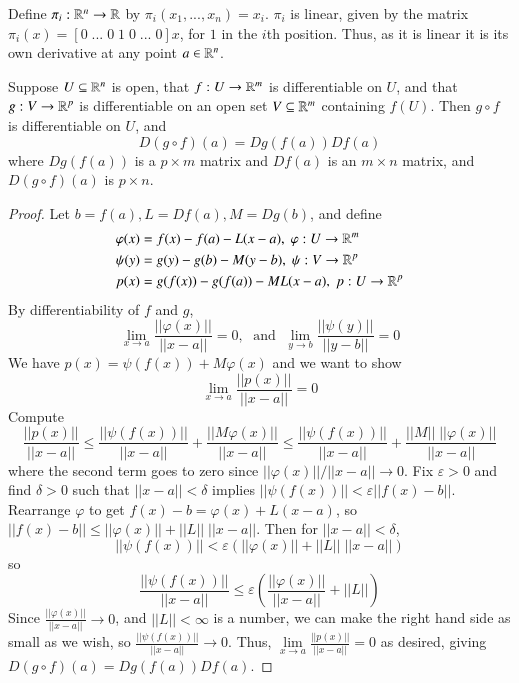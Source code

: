 \begin{eg}
    Define $\pi_i :\mathbb R^n\rightarrow \mathbb R$ by $\pi_i(x_1,...,x_n) = x_i$. $\pi_i$ is linear, given by the matrix $\pi_i(x) = [0\;...\;0\;1\;0\;...\;0]x$, for $1$ in the $i$th position. Thus, as it is linear it is its own derivative at any point $a \in \mathbb R^n$.
\end{eg}

\begin{prop}
    Suppose $U \subseteq \mathbb R^n$ is open, that $f:U\rightarrow \mathbb R^m$ is differentiable on $U$, and that $g:V\rightarrow \mathbb R^p$ is differentiable on an open set $V \subseteq \mathbb R^m$ containing $f(U)$. Then $g\circ f$ is differentiable on $U$, and $$D(g\circ f)(a) = Dg(f(a))Df(a)$$ where $Dg(f(a))$ is a $p\times m$ matrix and $Df(a)$ is an $m\times n$ matrix, and $D(g\circ f)(a)$ is $p\times n$.
\end{prop}
\begin{proof}
    Let $b = f(a), L = Df(a), M = Dg(b)$, and define \begin{align*}
        \varphi(x) &= f(x) - f(a) - L(x-a),\;\varphi:U\rightarrow \mathbb R^m \\
        \psi(y) &= g(y) - g(b) - M(y-b),\;\psi:V\rightarrow \mathbb R^p \\
        p(x) &= g(f(x)) - g(f(a)) - ML(x-a),\;p:U\rightarrow \mathbb R^p
    \end{align*}
    By differentiability of $f$ and $g$, $$\lim\limits_{x\rightarrow a}\frac{||\varphi(x)||}{||x-a||} = 0,\;\text{ and }\;\lim\limits_{y\rightarrow b}\frac{||\psi(y)||}{||y-b||} = 0$$ We have $p(x) = \psi(f(x)) + M\varphi(x)$ and we want to show $$\lim\limits_{x\rightarrow a}\frac{||p(x)||}{||x-a||} = 0$$ Compute $$\frac{||p(x)||}{||x-a||} \leq \frac{||\psi(f(x))||}{||x-a||} + \frac{||M\varphi(x)||}{||x-a||} \leq \frac{||\psi(f(x))||}{||x-a||} + \frac{||M||\;||\varphi(x)||}{||x-a||}$$ where the second term goes to zero since $||\varphi(x)||/||x-a||\rightarrow 0$. Fix $\varepsilon > 0$ and find $\delta > 0$ such that $||x-a|| < \delta$ implies $||\psi(f(x))|| < \varepsilon||f(x)-b||$. Rearrange $\varphi$ to get $f(x) - b = \varphi(x) + L(x-a)$, so $||f(x)-b|| \leq ||\varphi(x)|| + ||L||\;||x-a||$. Then for $||x-a|| < \delta$, $$||\psi(f(x))|| < \varepsilon(||\varphi(x)|| + ||L||\;||x-a||)$$ so $$\frac{||\psi(f(x))||}{||x-a||} \leq \varepsilon\left(\frac{||\varphi(x)||}{||x-a||} + ||L||\right)$$ Since $\frac{||\varphi(x)||}{||x-a||}\rightarrow 0$, and $||L|| < \infty$ is a number, we can make the right hand side as small as we wish, so $\frac{||\psi(f(x))||}{||x-a||}\rightarrow 0$. Thus, $\lim\limits_{x\rightarrow a}\frac{||p(x)||}{||x-a||} = 0$ as desired, giving $D(g\circ f)(a) = Dg(f(a))Df(a)$.
\end{proof}


